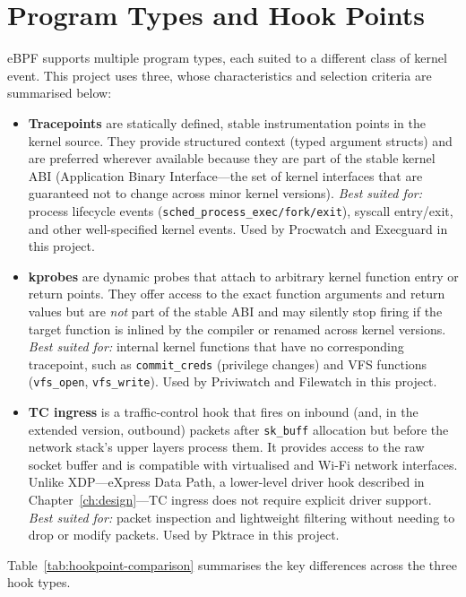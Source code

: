 \documentclass{mnitjaipur}
\begin{document}
\section{Program Types and Hook Points}
eBPF supports multiple program types, each suited to a different class of kernel event. This project uses three, whose characteristics and selection criteria are summarised below:

\begin{itemize}
  \item \textbf{Tracepoints} are statically defined, stable instrumentation points in the kernel source. They provide structured context (typed argument structs) and are preferred wherever available because they are part of the stable kernel ABI (Application Binary Interface---the set of kernel interfaces that are guaranteed not to change across minor kernel versions). \emph{Best suited for:} process lifecycle events (\texttt{sched\_process\_exec/fork/exit}), syscall entry/exit, and other well-specified kernel events. Used by Procwatch and Execguard in this project.

  \item \textbf{kprobes} are dynamic probes that attach to arbitrary kernel function entry or return points. They offer access to the exact function arguments and return values but are \emph{not} part of the stable ABI and may silently stop firing if the target function is inlined by the compiler or renamed across kernel versions. \emph{Best suited for:} internal kernel functions that have no corresponding tracepoint, such as \texttt{commit\_creds} (privilege changes) and VFS functions (\texttt{vfs\_open}, \texttt{vfs\_write}). Used by Priviwatch and Filewatch in this project.

  \item \textbf{TC ingress} is a traffic-control hook that fires on inbound (and, in the extended version, outbound) packets after \texttt{sk\_buff} allocation but before the network stack's upper layers process them. It provides access to the raw socket buffer and is compatible with virtualised and Wi-Fi network interfaces. Unlike XDP---eXpress Data Path, a lower-level driver hook described in Chapter~\ref{ch:design}---TC ingress does not require explicit driver support. \emph{Best suited for:} packet inspection and lightweight filtering without needing to drop or modify packets. Used by Pktrace in this project.
\end{itemize}

Table~\ref{tab:hookpoint-comparison} summarises the key differences across the three hook types.
\end{document}
